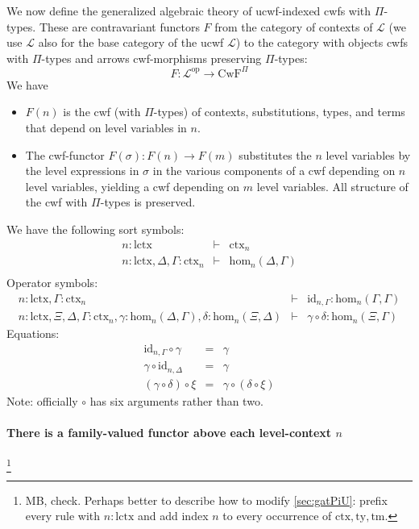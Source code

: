 \documentclass[11pt,a4paper]{article}
\theoremstyle{definition}
\newcommand{\id}{\mathsf{id}}
\def\Hom{\mathrm{hom}}
\def\id{\mathrm{id}}
\def\lctx{\mathrm{lctx}}
\newcommand{\ctx}{\mathrm{ctx}}
\newcommand{\ty}{\mathrm{ty}}
\newcommand{\tm}{\mathrm{tm}}
\def\L{{\mathcal{L}}}
\def\CwF{\mathrm{CwF}}
\begin{document}
We now define the generalized algebraic theory of ucwf-indexed cwfs with $\Pi$-types. These are contravariant functors $F$ from the category of contexts of $\L$ (we use $\L$ also for the base category of the ucwf $\L$)  to the category with objects cwfs with $\Pi$-types and arrows cwf-morphisms preserving $\Pi$-types:
$$
F : \L^\mathrm{op} \to \CwF^{\Pi}
$$
We have
\begin{itemize}
\item
$F(n)$ is the cwf (with $\Pi$-types) of contexts, substitutions, types, and terms that depend on level variables in $n$.
\item
The cwf-functor $F(\sigma) : F(n) \to F(m)$ substitutes the $n$ level variables by the level expressions in $\sigma$ in the various components of a cwf depending on $n$ level variables, yielding a cwf depending on $m$ level variables. All structure of the cwf with $\Pi$-types is preserved.
\end{itemize}
We have the following sort symbols:
\begin{eqnarray*}
n : \lctx &\vdash& \ctx_n\\
n : \lctx, \Delta, \Gamma : \ctx_n &\vdash& \Hom_n(\Delta,\Gamma)\\
\end{eqnarray*}
Operator symbols:
\begin{eqnarray*}
n : \lctx, \Gamma : \ctx_n &\vdash& \id_{n,\Gamma} : \Hom_n(\Gamma,\Gamma)\\
n : \lctx, \Xi,\Delta,\Gamma : \ctx_n, \gamma : \Hom_n(\Delta,\Gamma), \delta : \Hom_n(\Xi,\Delta) &\vdash&
\gamma \circ \delta : \Hom_n(\Xi,\Gamma)
\end{eqnarray*}
Equations:
\begin{eqnarray*}
\id_{n,\Gamma} \circ \gamma &=& \gamma \\
 \gamma \circ \id_{n,\Delta} &=& \gamma \\
(\gamma \circ \delta) \circ \xi &=& \gamma \circ (\delta \circ \xi)
\end{eqnarray*}
Note: officially $\circ$ has six arguments rather than two.

\paragraph{There is a family-valued functor above each level-context $n$}

\footnote{MB, check. Perhaps better to describe how to modify \ref{sec:gatPiU}:
prefix every rule with $n:\lctx$ and add index $n$ to every occurrence
of $\ctx,\ty,\tm$.}
\end{document}
